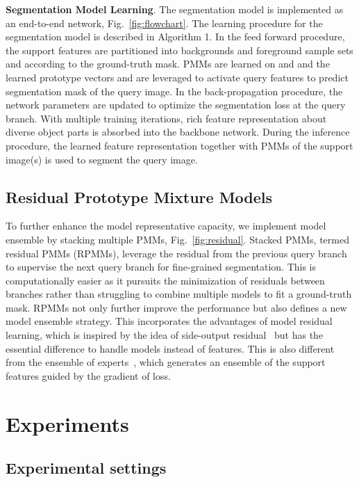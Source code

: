 \documentclass[runningheads]{llncs}
\begin{document}
\textbf{Segmentation Model Learning}.
The segmentation model is implemented as an end-to-end network, Fig.\ \ref{fig:flowchart}.
The learning procedure for the segmentation model is described in Algorithm 1. In the feed forward procedure, the support features are partitioned into backgrounds and foreground sample sets  and  according to the ground-truth mask. 
PMMs are learned on  and  and the learned prototype vectors  and  are leveraged to activate query features to predict segmentation mask of the query image. In the back-propagation procedure, the network parameters  are updated to optimize the segmentation loss at the query branch. With multiple training iterations, rich feature representation about diverse object parts is absorbed into the backbone network. 
During the inference procedure, the learned feature representation together with PMMs of the support image(s) is used to segment the query image. 


\subsection{Residual Prototype Mixture Models}
To further enhance the model representative capacity, we implement model ensemble by stacking multiple PMMs, Fig.\ \ref{fig:residual}. Stacked PMMs, termed residual PMMs (RPMMs), leverage the residual from the previous query branch to supervise the next query branch for fine-grained segmentation. 
This is computationally easier as it pursuits the minimization of residuals between branches rather than struggling to combine multiple models to fit a ground-truth mask. RPMMs not only further improve the performance but also defines a new model ensemble strategy. This incorporates the advantages of model residual learning, which is inspired by the idea of side-output residual~\cite{SRN17,RSRN17} but has the essential difference to handle models instead of features. This is also different from the ensemble of experts~\cite{FWB-ICCV2019}, which generates an ensemble of the support features guided by the gradient of loss.

\section{Experiments}

\subsection{Experimental settings}
\end{document}
